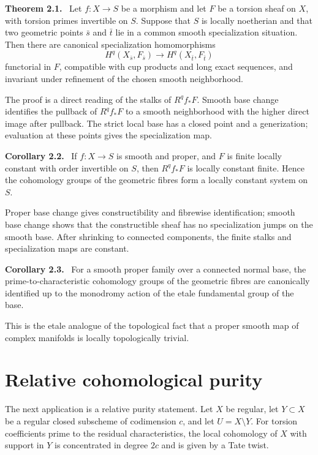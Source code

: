 \documentclass[12pt]{article}
\newenvironment{statement}[1]{\par\medskip\noindent\textbf{#1.}\ }{\par\medskip}
\begin{document}
\begin{statement}{Theorem 2.1}
Let \(f:X\to S\) be a morphism and let \(F\) be a torsion sheaf on \(X\), with torsion primes invertible on \(S\). Suppose that \(S\) is locally noetherian and that two geometric points \(\bar s\) and \(\bar t\) lie in a common smooth specialization situation. Then there are canonical specialization homomorphisms
\[
H^q(X_{\bar s},F_{\bar s})\longrightarrow H^q(X_{\bar t},F_{\bar t})
\]
functorial in \(F\), compatible with cup products and long exact sequences, and invariant under refinement of the chosen smooth neighborhood.
\end{statement}

The proof is a direct reading of the stalks of \(R^qf_*F\). Smooth base change identifies the pullback of \(R^qf_*F\) to a smooth neighborhood with the higher direct image after pullback. The strict local base has a closed point and a generization; evaluation at these points gives the specialization map.

\begin{statement}{Corollary 2.2}
If \(f:X\to S\) is smooth and proper, and \(F\) is finite locally constant with order invertible on \(S\), then \(R^qf_*F\) is locally constant finite. Hence the cohomology groups of the geometric fibres form a locally constant system on \(S\).
\end{statement}

Proper base change gives constructibility and fibrewise identification; smooth base change shows that the constructible sheaf has no specialization jumps on the smooth base. After shrinking to connected components, the finite stalks and specialization maps are constant.

\begin{statement}{Corollary 2.3}
For a smooth proper family over a connected normal base, the prime-to-characteristic cohomology groups of the geometric fibres are canonically identified up to the monodromy action of the etale fundamental group of the base.
\end{statement}

This is the etale analogue of the topological fact that a proper smooth map of complex manifolds is locally topologically trivial.

\section{Relative cohomological purity}

The next application is a relative purity statement. Let \(X\) be regular, let \(Y\subset X\) be a regular closed subscheme of codimension \(c\), and let \(U=X\setminus Y\). For torsion coefficients prime to the residual characteristics, the local cohomology of \(X\) with support in \(Y\) is concentrated in degree \(2c\) and is given by a Tate twist.
\end{document}
